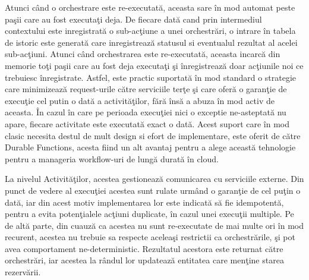 \documentclass[a4paper,12pt]{report}
\begin{document}
\par Atunci când o orchestrare este re-executată, aceasta sare în mod automat peste paşii care au fost executaţi deja. De fiecare dată cand prin intermediul contextului este inregistrată o sub-acţiune a unei orchestrări, o intrare în tabela de istoric este generată care inregistrează statusul si eventualul rezultat al acelei sub-acţiuni. Atunci când orchestrarea este re-executată, aceasta incarcă din memorie toţi paşii care au fost deja executaţi şi înregistrează doar acţiunile noi ce trebuiesc înregistrate. Astfel, este practic suportată în mod standard o strategie care minimizează request-urile către serviciile terţe şi care oferă o garanţie de execuţie cel putin o dată a activităţilor, fără însă a abuza în mod activ de aceasta. În cazul în care pe perioada execuţiei nici o exceptie ne-asteptată nu apare, fiecare activitate este executată exact o dată. Acest suport care în mod clasic necesita destul de mult design si efort de implementare, este oferit de către Durable Functions, acesta fiind un alt avantaj pentru a alege această tehnologie pentru a manageria workflow-uri de lungă durată în cloud. 
\par La nivelul Activităţilor, acestea gestionează comunicarea cu serviciile externe. Din punct de vedere al execuţiei acestea sunt rulate urmând o garanţie de cel puţin o dată, iar din acest motiv implementarea lor este indicată să fie idempotentă, pentru a evita potenţialele acţiuni duplicate, în cazul unei execuţii multiple. Pe de altă parte, din cuauză ca acestea nu sunt re-executate de mai multe ori în mod recurent, acestea nu trebuie sa respecte aceleaşi restrictii ca orchestrările, şi pot avea comportament ne-deterministic. Rezultatul acestora este returnat către orchestrări, iar acestea la rândul lor updatează entitatea care menţine starea rezervării. 
\end{document}
